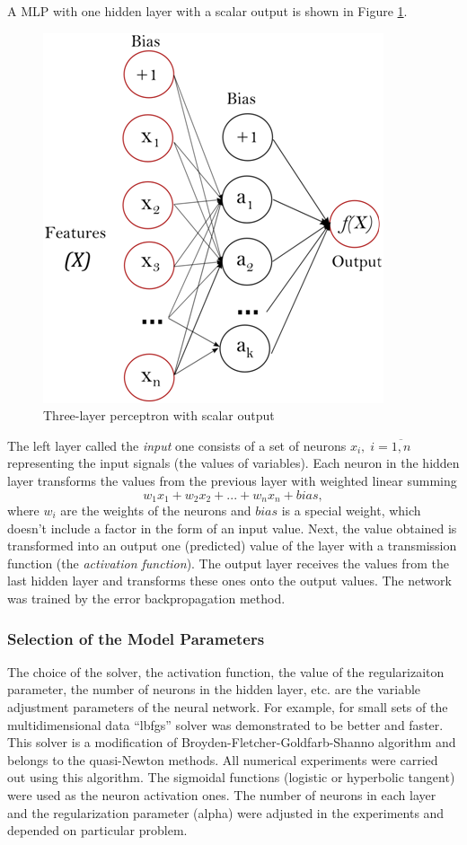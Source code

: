 \documentclass[sensors,article,submit,moreauthors,pdftex]{Definitions/mdpi}
\begin{document}
A MLP with one hidden layer with a scalar output is shown in Figure \ref{fig1}.

\begin{figure}[H]
\begin{center}
\includegraphics[width=0.5\linewidth]{perceptron.png}
\caption{Three-layer perceptron with scalar output}
\label{fig1}
\end{center}
\end{figure}   

The left layer called the \textit{input} one consists of a set of neurons $x_i, \; i=\overline{1,n}$ representing the input signals (the values of variables). Each neuron in the hidden layer transforms the values from the previous layer with weighted linear summing 
\[
w_1 x_1 + w_2 x_2+...+w_n x_n+bias,
\]
where $w_i$ are the weights of the neurons and $bias$ is a special weight, which doesn't include a factor in the form of an input value. Next, the value obtained is transformed into an output one (predicted) value of the layer with a transmission function (the \textit{activation function}). The output layer receives the values from the last hidden layer and transforms these ones onto the output values. The network was trained by the error backpropagation method.

\subsubsection{Selection of the Model Parameters}

The choice of the solver, the activation function, the value of the regularizaiton parameter, the number of neurons in the hidden layer, etc. are the variable adjustment parameters of the neural network.
For example, for small sets of the multidimensional data ``lbfgs'' solver was demonstrated to be better and faster. This solver is a modification of Broyden-Fletcher-Goldfarb-Shanno algorithm \cite{Nocedal2006} and belongs to the quasi-Newton methods. All numerical experiments were carried out using this algorithm.
The sigmoidal functions (logistic or hyperbolic tangent) were used as the neuron activation ones.
The number of neurons in each layer and the regularization parameter (alpha) were adjusted in the experiments and depended on particular problem.
\end{document}

